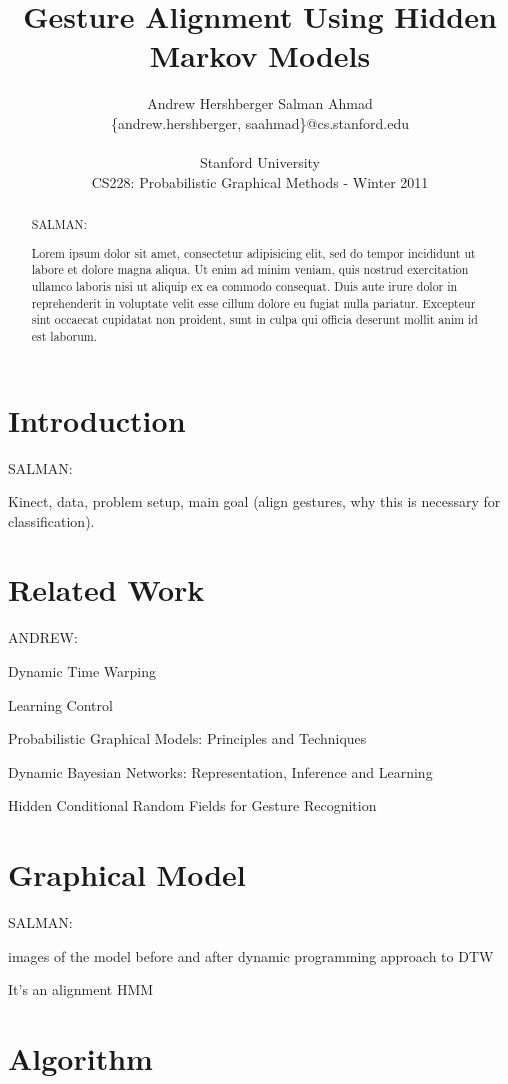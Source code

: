 \documentclass{article}
\title{Gesture Alignment Using Hidden Markov Models}
\author{
Andrew Hershberger
\quad Salman Ahmad \\
\{andrew.hershberger, saahmad\}@cs.stanford.edu
\\\\
Stanford University\\
CS228: Probabilistic Graphical Methods - Winter 2011\\
}
\begin{document}
\maketitle

\begin{abstract}

SALMAN:

Lorem ipsum dolor sit amet, consectetur adipisicing elit, sed do 
tempor incididunt ut labore et dolore magna aliqua. Ut enim ad minim veniam,
quis nostrud exercitation ullamco laboris nisi ut aliquip ex ea commodo
consequat. Duis aute irure dolor in reprehenderit in voluptate velit esse
cillum dolore eu fugiat nulla pariatur. Excepteur sint occaecat cupidatat non
proident, sunt in culpa qui officia deserunt mollit anim id est laborum.

\end{abstract}

\section{Introduction}

SALMAN:

Kinect, data, problem setup, main goal (align gestures, why this is necessary for classification).

\section{Related Work}

ANDREW:

Dynamic Time Warping \cite{Listgarten2005}

Learning Control \cite{Coates2008}

Probabilistic Graphical Models: Principles and Techniques \cite{Koller2009}

Dynamic Bayesian Networks: Representation, Inference and Learning \cite{Muphy2002}

Hidden Conditional Random Fields for Gesture Recognition \cite{Wang2006}


\section{Graphical Model}

SALMAN:

images of the model before and after dynamic programming approach to DTW

It's an alignment HMM

\section{Algorithm}
\end{document}

